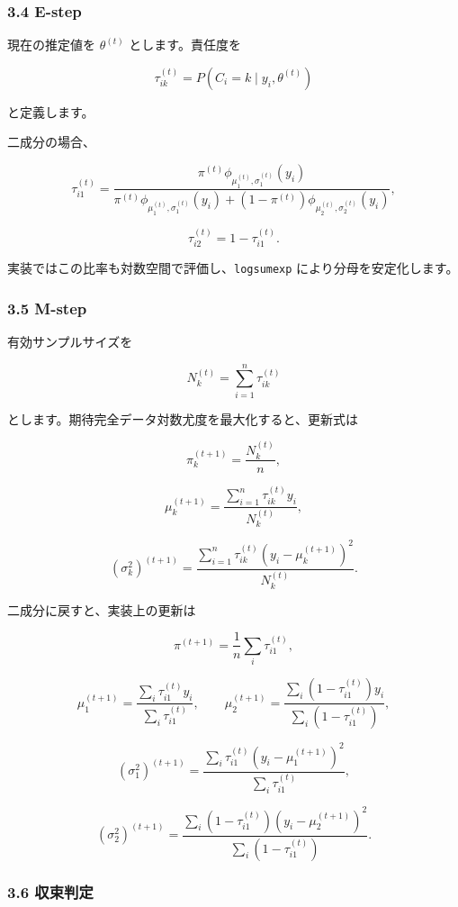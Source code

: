 \documentclass[
]{article}
\begin{document}
\hypertarget{e-step}{%
\subsubsection{3.4 E-step}\label{e-step}}

現在の推定値を \(\theta^{(t)}\) とします。責任度を

\[
\tau_{ik}^{(t)}
=P(C_i=k\mid y_i,\theta^{(t)})
\]

と定義します。

二成分の場合、

\[
\tau_{i1}^{(t)}
=\frac{\pi^{(t)}\phi_{\mu_1^{(t)},\sigma_1^{(t)}}(y_i)}
{\pi^{(t)}\phi_{\mu_1^{(t)},\sigma_1^{(t)}}(y_i)
+(1-\pi^{(t)})\phi_{\mu_2^{(t)},\sigma_2^{(t)}}(y_i)},
\]

\[
\tau_{i2}^{(t)}=1-\tau_{i1}^{(t)}.
\]

実装ではこの比率も対数空間で評価し、\texttt{logsumexp}
により分母を安定化します。

\hypertarget{m-step}{%
\subsubsection{3.5 M-step}\label{m-step}}

有効サンプルサイズを

\[
N_k^{(t)}=\sum_{i=1}^{n}\tau_{ik}^{(t)}
\]

とします。期待完全データ対数尤度を最大化すると、更新式は

\[
\pi_k^{(t+1)}=\frac{N_k^{(t)}}{n},
\]

\[
\mu_k^{(t+1)}=\frac{\sum_{i=1}^{n}\tau_{ik}^{(t)}y_i}{N_k^{(t)}},
\]

\[
(\sigma_k^2)^{(t+1)}
=\frac{\sum_{i=1}^{n}\tau_{ik}^{(t)}(y_i-\mu_k^{(t+1)})^2}{N_k^{(t)}}.
\]

二成分に戻すと、実装上の更新は

\[
\pi^{(t+1)}=\frac{1}{n}\sum_i \tau_{i1}^{(t)},
\]

\[
\mu_1^{(t+1)}=\frac{\sum_i\tau_{i1}^{(t)}y_i}{\sum_i\tau_{i1}^{(t)}},
\qquad
\mu_2^{(t+1)}=\frac{\sum_i(1-\tau_{i1}^{(t)})y_i}{\sum_i(1-\tau_{i1}^{(t)})},
\]

\[
(\sigma_1^2)^{(t+1)}=\frac{\sum_i\tau_{i1}^{(t)}(y_i-\mu_1^{(t+1)})^2}{\sum_i\tau_{i1}^{(t)}},
\]

\[
(\sigma_2^2)^{(t+1)}=\frac{\sum_i(1-\tau_{i1}^{(t)})(y_i-\mu_2^{(t+1)})^2}{\sum_i(1-\tau_{i1}^{(t)})}.
\]

\hypertarget{ux53ceux675fux5224ux5b9a}{%
\subsubsection{3.6 収束判定}\label{ux53ceux675fux5224ux5b9a}}
\end{document}
